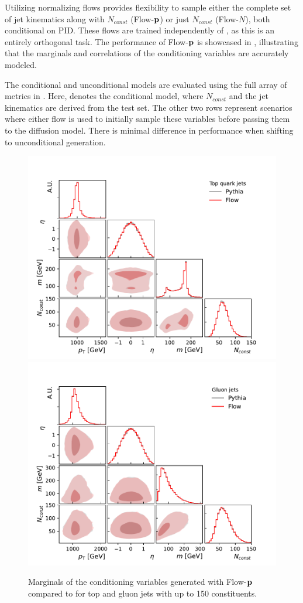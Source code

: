 Utilizing normalizing flows provides flexibility to sample either the complete set of jet kinematics along with $N_{const}$ (Flow-$\mathbf{p}$) or just $N_{const}$ (Flow-$N$), both conditional on PID.
These flows are trained independently of \pcdroid, as this is an entirely orthogonal task.
The performance of Flow-$\mathbf{p}$ is showcased in , illustrating that the marginals and correlations of the conditioning variables are accurately modeled.

The conditional and unconditional models are evaluated using the full array of metrics in .
Here, \pcdroid denotes the conditional model, where $N_{const}$ and the jet kinematics are derived from the test set.
The other two rows represent scenarios where either flow is used to initially sample these variables before passing them to the diffusion model.
There is minimal difference in performance when shifting to unconditional generation.

\begin{figure}[ht]
    \centering
    \includegraphics[width=0.49\linewidth]{Figures/jet_generation/droid/150/flow_quality_t.pdf}
    \includegraphics[width=0.49\linewidth]{Figures/jet_generation/droid/150/flow_quality_g.pdf}
    \caption{Marginals of the conditioning variables generated with Flow-$\mathbf{p}$ compared to \pythia for top and gluon jets with up to 150 constituents.
    }
    \label{fig:unconditional-flows}
\end{figure}

